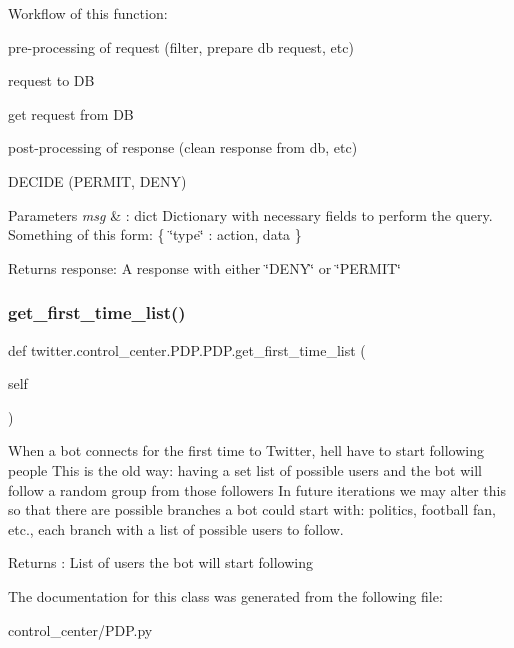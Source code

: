 Workflow of this function\+: 


\begin{DoxyEnumerate}
\item pre-\/processing of request (filter, prepare db request, etc)
\item request to DB
\item get request from DB
\item post-\/processing of response (clean response from db, etc)
\item D\+E\+C\+I\+DE (P\+E\+R\+M\+IT, D\+E\+NY)
\end{DoxyEnumerate}


\begin{DoxyParams}{Parameters}
{\em msg} & \+: dict Dictionary with necessary fields to perform the query. Something of this form\+: \{ \char`\"{}type\char`\"{} \+: action, data \}\\
\hline
\end{DoxyParams}
\begin{DoxyReturn}{Returns}
response\+: A response with either \char`\"{}\+D\+E\+N\+Y\char`\"{} or \char`\"{}\+P\+E\+R\+M\+I\+T\char`\"{} 
\end{DoxyReturn}
\mbox{\label{classtwitter_1_1control__center_1_1PDP_1_1PDP_a5ac3bf5edb6f1913f09aecf0fe1ccc7f}} 
\subsubsection{\texorpdfstring{get\+\_\+first\+\_\+time\+\_\+list()}{get\_first\_time\_list()}}
{\footnotesize\ttfamily def twitter.\+control\+\_\+center.\+P\+D\+P.\+P\+D\+P.\+get\+\_\+first\+\_\+time\+\_\+list (\begin{DoxyParamCaption}\item[{}]{self }\end{DoxyParamCaption})}



When a bot connects for the first time to Twitter, he\textquotesingle{}ll have to start following people This is the old way\+: having a set list of possible users and the bot will follow a random group from those followers In future iterations we may alter this so that there are possible branches a bot could start with\+: politics, football fan, etc., each branch with a list of possible users to follow. 

\begin{DoxyReturn}{Returns}
\+: List of users the bot will start following 
\end{DoxyReturn}


The documentation for this class was generated from the following file\+:\begin{DoxyCompactItemize}
\item 
control\+\_\+center/P\+D\+P.\+py\end{DoxyCompactItemize}
